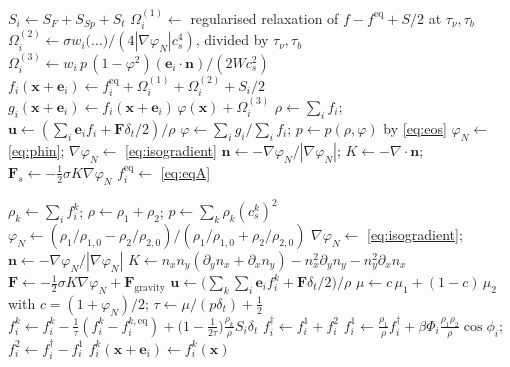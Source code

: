 \documentclass[11pt,a4paper]{article}
\theoremstyle{plain}
\theoremstyle{definition}
\newcommand{\ee}{\mathbf{e}}
\newcommand{\uu}{\mathbf{u}}
\newcommand{\xx}{\mathbf{x}}
\newcommand{\nn}{\mathbf{n}}
\newcommand{\FF}{\mathbf{F}}
\newcommand{\cs}{c_s}
\begin{document}
\begin{algorithm}[htbp]
\caption{One step of Model A, \texttt{cglbm::lbm::Solver}}
\label{alg:A}
\begin{algorithmic}[1]
\State $S_i \gets S_F + S_{Sp} + S_t$ 
\State $\Omega^{(1)}_i \gets$ regularised relaxation of $f - f^{\mathrm{eq}} + S/2$ at $\tau_\nu, \tau_b$
  \State $\Omega^{(2)}_i \gets \sigma w_i \bigl(\ldots\bigr)/(4|\nabla\varphi_N|\cs^4)$, divided by $\tau_\nu, \tau_b$
\EndIf
\State $\Omega^{(3)}_i \gets w_i\, p\,(1-\varphi^2)(\ee_i\!\cdot\!\nn) / (2 W \cs^2)$ 
\State $f_i(\xx + \ee_i) \gets f^{\mathrm{eq}}_i + \Omega^{(1)}_i + \Omega^{(2)}_i + S_i/2$
\State $g_i(\xx + \ee_i) \gets f_i(\xx+\ee_i)\,\varphi(\xx) + \Omega^{(3)}_i$
\State $\rho \gets \sum_i f_i$; \quad $\uu \gets (\sum_i \ee_i f_i + \FF\delta_t/2)/\rho$
\State $\varphi \gets \sum_i g_i / \sum_i f_i$; \quad $p \gets p(\rho, \varphi)$ by \eqref{eq:eos}
\State $\varphi_N \gets$ \eqref{eq:phin}; \quad $\nabla\varphi_N \gets$ \eqref{eq:isogradient}
  \State $\nn \gets -\nabla\varphi_N/|\nabla\varphi_N|$; \quad $K \gets -\nabla\!\cdot\!\nn$;
         \quad $\FF_s \gets -\tfrac12\sigma K \nabla\varphi_N$
\EndIf
\State $f^{\mathrm{eq}}_i \gets$ \eqref{eq:eqA}
\end{algorithmic}
\end{algorithm}

\begin{algorithm}[htbp]
\caption{One step of Model B, \texttt{cglbm::lbm::TwoPopulationSolver}}
\label{alg:B}
\begin{algorithmic}[1]
\State $\rho_k \gets \sum_i f_i^k$; \quad $\rho \gets \rho_1 + \rho_2$;
       \quad $p \gets \sum_k \rho_k (\cs^k)^2$
\State $\varphi_N \gets (\rho_1/\rho_{1,0} - \rho_2/\rho_{2,0}) / (\rho_1/\rho_{1,0} + \rho_2/\rho_{2,0})$
\State $\nabla\varphi_N \gets$ \eqref{eq:isogradient}; \quad
       $\nn \gets -\nabla\varphi_N/|\nabla\varphi_N|$
\State $K \gets n_x n_y(\partial_y n_x + \partial_x n_y) - n_x^2 \partial_y n_y - n_y^2 \partial_x n_x$
\State $\FF \gets -\tfrac12 \sigma K \nabla\varphi_N + \FF_{\mathrm{gravity}}$
\State $\uu \gets \bigl(\sum_k\sum_i \ee_i f_i^k + \FF \delta_t/2\bigr)/\rho$
\State $\mu \gets c\,\mu_1 + (1-c)\,\mu_2$ with $c = (1+\varphi_N)/2$;
       \quad $\tau \gets \mu/(p\delta_t) + \tfrac12$
  \State $f_i^k \gets f_i^k - \tfrac{1}{\tau}(f_i^k - f_i^{k,\mathrm{eq}})
         + \bigl(1 - \tfrac{1}{2\tau}\bigr)\tfrac{\rho_k}{\rho} S_i \delta_t$
\EndFor
\State $f_i^\dagger \gets f_i^1 + f_i^2$
\State $f_i^{1} \gets \tfrac{\rho_1}{\rho}f_i^\dagger
       + \beta \Phi_i \tfrac{\rho_1\rho_2}{\rho}\cos\phi_i$;
       \quad $f_i^{2} \gets f_i^\dagger - f_i^{1}$ 
\State $f_i^k(\xx + \ee_i) \gets f_i^k(\xx)$
\end{algorithmic}
\end{algorithm}
\end{document}
